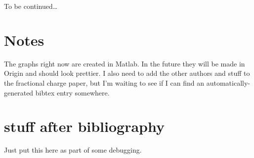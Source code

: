 \documentclass[superscriptaddress,aps,prb,11pt]{revtex4-1}
\begin{document}
\begin{acknowledgments}
To be continued\ldots
\end{acknowledgments}

\section{Notes}
The graphs right now are created in Matlab.  In the future they will be made in Origin and should look prettier.  I also need to add the other authors and stuff to the fractional charge paper, but I'm waiting to see if I can find an automatically-generated bibtex entry somewhere.

\nocite{fractionalcharge}



\section{stuff after bibliography}
Just put this here as part of some debugging.
\end{document}
